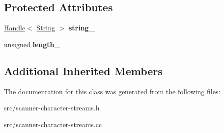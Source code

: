 \subsection*{Protected Attributes}
\begin{DoxyCompactItemize}
\item 
\hypertarget{classv8_1_1internal_1_1_generic_string_utf16_character_stream_a0c661cfae995c45e74c9a04c4fadf0f5}{}\hyperlink{classv8_1_1internal_1_1_handle}{Handle}$<$ \hyperlink{classv8_1_1internal_1_1_string}{String} $>$ {\bfseries string\+\_\+}\label{classv8_1_1internal_1_1_generic_string_utf16_character_stream_a0c661cfae995c45e74c9a04c4fadf0f5}

\item 
\hypertarget{classv8_1_1internal_1_1_generic_string_utf16_character_stream_a4a21ae22eed6b89085bb64bcde939a5f}{}unsigned {\bfseries length\+\_\+}\label{classv8_1_1internal_1_1_generic_string_utf16_character_stream_a4a21ae22eed6b89085bb64bcde939a5f}

\end{DoxyCompactItemize}
\subsection*{Additional Inherited Members}


The documentation for this class was generated from the following files\+:\begin{DoxyCompactItemize}
\item 
src/scanner-\/character-\/streams.\+h\item 
src/scanner-\/character-\/streams.\+cc\end{DoxyCompactItemize}

